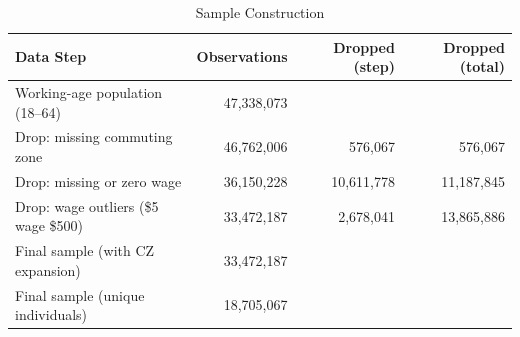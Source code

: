 \begin{table}[ht]
\centering
\begin{tabular}{lrrr}
  \toprule
Data Step & Observations & Dropped (step) & Dropped (total) \\ 
  \midrule
Working-age population (18--64) & 47,338,073 &  &  \\ 
  Drop: missing commuting zone & 46,762,006 & 576,067 & 576,067 \\ 
  Drop: missing or zero wage & 36,150,228 & 10,611,778 & 11,187,845 \\ 
  Drop: wage outliers (\$5 \> wage \> \$500) & 33,472,187 & 2,678,041 & 13,865,886 \\ 
  Final sample (with CZ expansion) & 33,472,187 &  &  \\ 
  Final sample (unique individuals) & 18,705,067 &  &  \\ 
   \bottomrule
\end{tabular}
\caption{Sample Construction} 
\label{tab:drop_summary}
\end{table}
